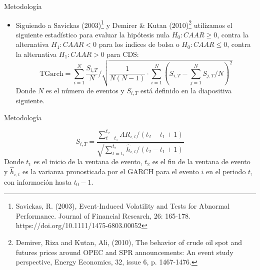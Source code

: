 \documentclass{beamer}
\begin{document}
\begin{frame}{Metodología}
\begin{itemize}
\item Siguiendo a Savickas (2003)\footnote{Savickas, R. (2003), Event-Induced Volatility and Tests for Abnormal Performance. Journal of Financial Research, 26: 165-178. https://doi.org/10.1111/1475-6803.00052} y Demirer \& Kutan (2010)\footnote{Demirer, Riza and Kutan, Ali, (2010), The behavior of crude oil spot and futures prices around OPEC and SPR announcements: An event study perspective, Energy Economics, 32, issue 6, p. 1467-1476.} utilizamos el siguiente estadístico para evaluar la hipótesis nula $H_0: CAAR\geq0$, contra la alternativa $H_1: CAAR<0$ para los indices de bolsa o $H_0: CAAR\leq 0$, contra la alternativa $H_1: CAAR>0$ para CDS:
\begin{equation}
\text {TGarch}=\sum_{i=1}^N \frac{S_{i, T}}{N} / \sqrt{\frac{1}{N(N-1)} \cdot \sum_{i=1}^N\left(S_{i, T}-\sum_{j=1}^N S_{j, T} / N\right)^2}
\end{equation}
Donde $N$ es el número de eventos y $S_{i,T}$ está definido en la diapositiva siguiente.
\end{itemize}
\end{frame}

\begin{frame}{Metodología}

\begin{equation}
        S_{i,T} = \frac{\sum_{t=t_1}^{t_2}AR_{i,t}/(t_2-t_1+1)}{\sqrt{\sum_{t=t_1}^{t_2}\hat{h}_{i,t}/(t_2-t_1+1)}} \label{eq:sit}
\end{equation}
Donde $t_1$ es el inicio de la ventana de evento, $t_2$ es el fin de la ventana de evento y $\hat{h}_{i,t}$ es la varianza pronosticada por el GARCH para el evento $i$ en el periodo $t$, con información hasta $t_0-1$.

\end{frame}
\end{document}
